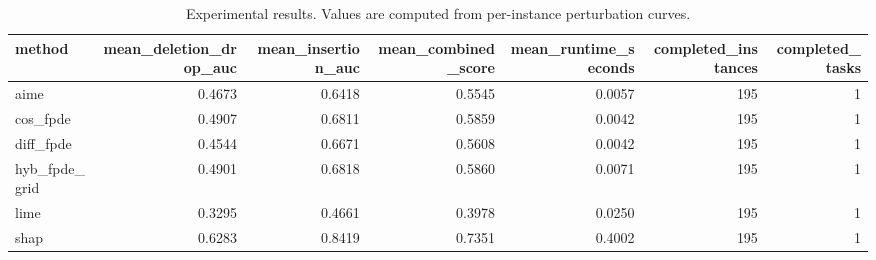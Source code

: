 \begin{table}[t]
\caption{Experimental results. Values are computed from per-instance perturbation curves.}
\label{tab:main_results_computed}
\centering
\begin{tabular}{lrrrrrr}
\toprule
method & mean\_deletion\_drop\_auc & mean\_insertion\_auc & mean\_combined\_score & mean\_runtime\_seconds & completed\_instances & completed\_tasks \\
\midrule
aime & 0.4673 & 0.6418 & 0.5545 & 0.0057 & 195 & 1 \\
cos\_fpde & 0.4907 & 0.6811 & 0.5859 & 0.0042 & 195 & 1 \\
diff\_fpde & 0.4544 & 0.6671 & 0.5608 & 0.0042 & 195 & 1 \\
hyb\_fpde\_grid & 0.4901 & 0.6818 & 0.5860 & 0.0071 & 195 & 1 \\
lime & 0.3295 & 0.4661 & 0.3978 & 0.0250 & 195 & 1 \\
shap & 0.6283 & 0.8419 & 0.7351 & 0.4002 & 195 & 1 \\
\bottomrule
\end{tabular}

\end{table}
